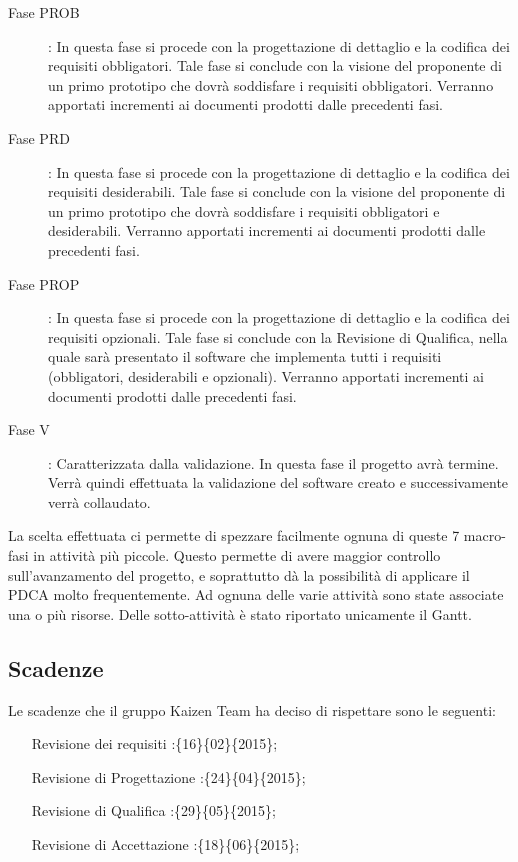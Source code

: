 \begin{description}
			\item[Fase PROB]: In questa fase si procede con la progettazione di dettaglio e la codifica dei requisiti obbligatori. Tale fase si conclude con la visione del proponente di un primo prototipo che dovrà soddisfare i requisiti obbligatori. Verranno apportati incrementi ai documenti prodotti dalle precedenti fasi.
			\item[Fase PRD]: In questa fase si procede con la progettazione di dettaglio e la codifica dei requisiti desiderabili. Tale fase si conclude con la visione del proponente di un primo prototipo che dovrà soddisfare i requisiti obbligatori e desiderabili. Verranno apportati incrementi ai documenti prodotti dalle precedenti fasi.
			\item[Fase PROP]: In questa fase si procede con la progettazione di dettaglio e la codifica dei requisiti opzionali. Tale fase si conclude con la Revisione di Qualifica, nella quale sarà presentato il software che implementa tutti i requisiti (obbligatori, desiderabili e opzionali). Verranno apportati incrementi ai documenti prodotti dalle precedenti fasi.
			\item[Fase V]: Caratterizzata dalla validazione. In questa fase il progetto avrà termine. Verrà  quindi effettuata la validazione del software creato e successivamente verrà collaudato.
		\end{description}
		La scelta effettuata ci permette di spezzare facilmente ognuna di queste 7 macro-fasi in attività più piccole. Questo permette di avere maggior controllo sull’avanzamento del progetto, e soprattutto dà la possibilità di applicare il PDCA molto frequentemente.
		Ad ognuna delle varie attività sono state associate una o più risorse. Delle sotto-attività è stato riportato unicamente il Gantt.
	\subsection{Scadenze}
		Le scadenze che il gruppo Kaizen Team ha deciso di rispettare sono le seguenti:
		\begin{itemize}
			\item[Revisione dei requisiti]:\insdate\{16\}\{02\}\{2015\};
			\item[Revisione di Progettazione]:\insdate\{24\}\{04\}\{2015\};
			\item[Revisione di Qualifica]:\insdate\{29\}\{05\}\{2015\};
			\item[Revisione di Accettazione]:\insdate\{18\}\{06\}\{2015\};
		\end{itemize}

